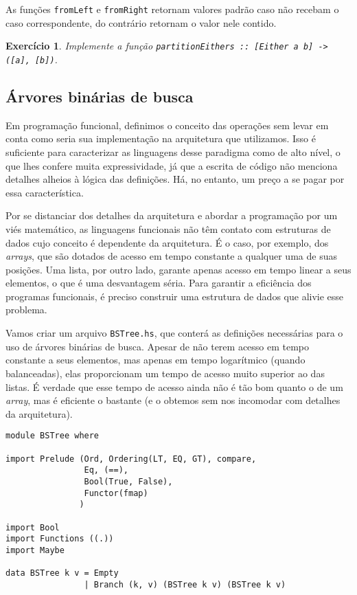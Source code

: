 \documentclass[a4paper]{article}
\newtheorem{exercicio}{Exercício}
\begin{document}
As funções \texttt{fromLeft} e \texttt{fromRight} retornam valores padrão caso não recebam o caso correspondente, do contrário retornam o valor nele contido.

\begin{exercicio}
	Implemente a função \emph{\texttt{partitionEithers :: [Either a b] -> ([a], [b])}}.
\end{exercicio}

\subsection{Árvores binárias de busca}

Em programação funcional, definimos o conceito das operações sem levar em conta como seria sua implementação na arquitetura que utilizamos.
Isso é suficiente para caracterizar as linguagens desse paradigma como de alto nível, o que lhes confere muita expressividade, já que a escrita de código não menciona detalhes alheios à lógica das definições.
Há, no entanto, um preço a se pagar por essa característica.

Por se distanciar dos detalhes da arquitetura e abordar a programação por um viés matemático, as linguagens funcionais não têm contato com estruturas de dados cujo conceito é dependente da arquitetura.
É o caso, por exemplo, dos \emph{arrays}, que são dotados de acesso em tempo constante a qualquer uma de suas posições.
Uma lista, por outro lado, garante apenas acesso em tempo linear a seus elementos, o que é uma desvantagem séria.
Para garantir a eficiência dos programas funcionais, é preciso construir uma estrutura de dados que alivie esse problema.

Vamos criar um arquivo \texttt{BSTree.hs}, que conterá as definições necessárias para o uso de árvores binárias de busca.
Apesar de não terem acesso em tempo constante a seus elementos, mas apenas em tempo logarítmico (quando balanceadas), elas proporcionam um tempo de acesso muito superior ao das listas.
É verdade que esse tempo de acesso ainda não é tão bom quanto o de um \emph{array}, mas é eficiente o bastante (e o obtemos sem nos incomodar com detalhes da arquitetura).

\begin{verbatim}
module BSTree where

import Prelude (Ord, Ordering(LT, EQ, GT), compare,
                Eq, (==),
                Bool(True, False),
                Functor(fmap)
               )

import Bool
import Functions ((.))
import Maybe

data BSTree k v = Empty
                | Branch (k, v) (BSTree k v) (BSTree k v)
\end{verbatim}
\end{document}
